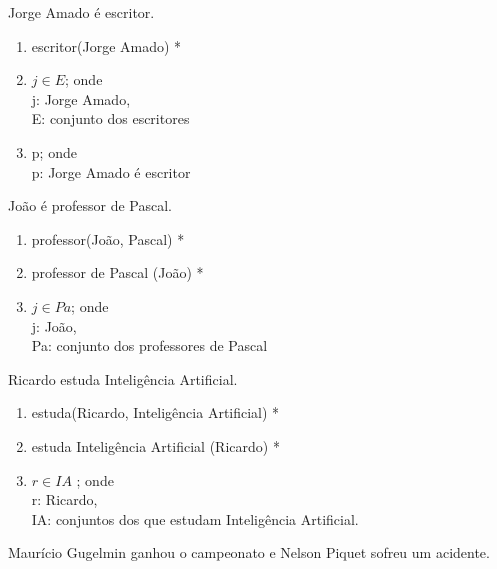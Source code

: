 \bigskip
\begin{exemplo} Jorge Amado é escritor.
\end{exemplo}

\begin{enumerate}[label=(\roman*)]
    \item escritor(Jorge Amado) *
    \item $j \in E$; onde\\
    j: Jorge Amado,\\
    E: conjunto dos escritores
    \item p; onde\\
    p: Jorge Amado é escritor
\end{enumerate}

\bigskip
\begin{exemplo} João é professor de Pascal.
\end{exemplo}

\begin{enumerate}[label=(\roman*)]
    \item professor(João, Pascal) *
    \item professor de Pascal (João) *
    \item $j \in Pa$; onde\\
    j: João,\\
    Pa: conjunto dos professores de Pascal
\end{enumerate}

\bigskip
\begin{exemplo} Ricardo estuda Inteligência Artificial.
 \end{exemplo}

\begin{enumerate}[label=(\roman*)]
    \item estuda(Ricardo, Inteligência Artificial) *
    \item estuda Inteligência Artificial (Ricardo) *
    \item $r \in IA$ ; onde\\
    r: Ricardo,\\
    IA: conjuntos dos que estudam Inteligência Artificial.
\end{enumerate}

\bigskip
\begin{exemplo} Maurício Gugelmin ganhou o campeonato e Nelson Piquet sofreu um acidente.
\end{exemplo}

